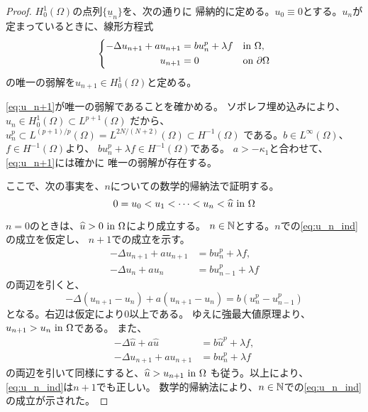 \begin{proof}
 $H_0^1(\Omega)$の点列$\{ \underline{u}_n \}$を、次の通りに
 帰納的に定める。$u_0 \equiv 0$とする。$u_n$が
 定まっているときに、線形方程式
  \begin{align}
   \left\{
   \begin{aligned}
    -\Delta u_{n+1} + a u_{n+1} 
    &= b u_n^p + \lambda f  & &\text{in}~ \Omega,  \\
    u_{n+1} &= 0 & &\text{on}~ \partial\Omega
   \end{aligned}
   \right. \label{eq:u_n+1}
  \end{align}
 の唯一の弱解を$u_{n+1} \in H_0^1(\Omega)$と定める。
 
 \eqref{eq:u_n+1}が唯一の弱解であることを確かめる。
 ソボレフ埋め込みにより、
 $
  u_n \in H_0^1(\Omega) \subset L^{p+1}(\Omega)
 $
 だから、
 $
  u_n^p \subset L^{(p+1)/p}(\Omega)
 = L^{2N/(N+2)}(\Omega) \subset H^{-1}(\Omega)
 $
 である。$b \in L^\infty(\Omega)$、$f \in H^{-1}(\Omega)$より、
 $b u_n^p + \lambda f \in H^{-1}(\Omega)$である。
 $a > -\kappa_1$と合わせて、\eqref{eq:u_n+1}には確かに
 唯一の弱解が存在する。

 ここで、次の事実を、$n$についての数学的帰納法で証明する。
 \begin{equation}
  0 = u_0 < u_1 < \dots < u_n < \widehat{u} ~\text{in}~ \Omega \label{eq:u_n_ind}
 \end{equation}

 $n = 0$のときは、$\widehat{u} > 0 ~\text{in}~ \Omega$により成立する。
 $n \in \mathbb{N}$とする。$n$での\eqref{eq:u_n_ind}の成立を仮定し、
 $n+1$での成立を示す。
 \begin{align*}
  -\Delta u_{n+1} + a u_{n+1} &= b u_n^p + \lambda f, \\
  -\Delta u_{n} + a u_{n} &= b u_{n-1}^p + \lambda f
 \end{align*}
 の両辺を引くと、
 \[
  -\Delta (u_{n+1} - u_n) + a(u_{n+1} - u_n) = b(u_n^p - u_{n-1}^p)
 \]
 となる。右辺は仮定により$0$以上である。
 ゆえに強最大値原理より、$u_{n+1} > u_n ~\text{in}~\Omega$である。
 また、
 \begin{align*}
  -\Delta \hat{u} + a \hat{u} &= b \hat{u}^p + \lambda f, \\
  -\Delta u_{n+1} + a u_{n+1} &= b u_{n}^p + \lambda f
 \end{align*}
 の両辺を引いて同様にすると、$\widehat{u} > u_{n+1} ~\text{in}~\Omega$
 も従う。以上により、\eqref{eq:u_n_ind}は$n+1$でも正しい。
 数学的帰納法により、$n \in \mathbb{N}$での\eqref{eq:u_n_ind}の成立が示された。


\end{proof}
